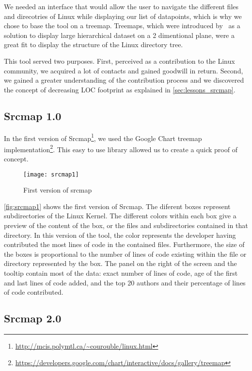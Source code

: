 We needed an interface that would allow the user to navigate the different files and direcotries of Linux while displaying our list of datapoints, which is why we chose to base the tool on a treemap. Treemaps, which were introduced by~\citep{Bederson-2002} as a solution to display large hierarchical dataset on a 2 dimentional plane, were a great fit to display the structure of the Linux directory tree. 

This tool served two purposes. First, perceived as a contribution to the Linux community, we acquired a lot of contacts and gained goodwill in return. Second, we gained a greater understanding of the contribution process and we discovered the concept of decreasing \ac{LOC} footprint as explained in \autoref{sec:lessons_srcmap}.

\subsection{Srcmap 1.0}

In the first version of Srcmap\footnote{\url{http://mcis.polymtl.ca/~courouble/linux.html}}, we used the Google Chart treemap implementation\footnote{\url{https://developers.google.com/chart/interactive/docs/gallery/treemap}}. This easy to use library allowed us to create a quick proof of concept. 

\begin{figure}[htb]
\centering
\texttt{[image: srcmap1]}
\caption{First version of srcmap}
\label{fig:srcmap1}
\end{figure}

\autoref{fig:srcmap1} shows the first version of Srcmap. The diferent boxes represent subdirectories of the Linux Kernel. The different colors within each box give a preview of the content of the box, or the files and subdirectories contained in that directory. In this version of the tool, the color represents the developer having contributed the most lines of code in the contained files. Furthermore, the size of the boxes is proportional to the number of lines of code existing within the file or directory represented by the box. The panel on the right of the screen and the tooltip contain most of the data: exact number of lines of code, age of the first and last lines of code added, and the top 20 authors and their percentage of lines of code contributed.


\subsection{Srcmap 2.0}

